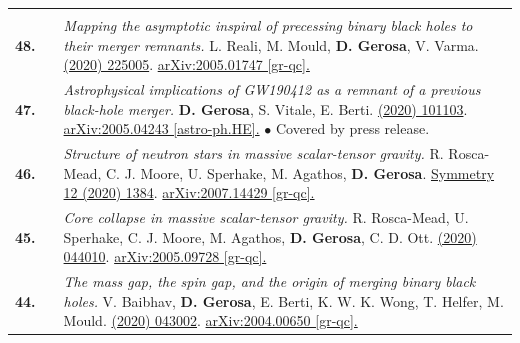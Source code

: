 {\begin{longtable}{rp{0.3cm}p{15.8cm}}
\vspace{0.09cm}\\
%
\textbf{48.} & & \textit{Mapping the asymptotic inspiral of precessing binary black holes to their merger remnants.}
\newline{}
L. Reali, M. Mould, \textbf{D. Gerosa}, V. Varma.
\newline{}
\href{https://iopscience.iop.org/article/10.1088/1361-6382/abb639/meta}{\cqg 37 (2020) 225005}. \href{https://arxiv.org/abs/2005.01747}{arXiv:2005.01747 [gr-qc].}
\vspace{0.09cm}\\
%
\textbf{47.} & & \textit{Astrophysical implications of GW190412 as a remnant of a previous black-hole merger.}
\newline{}
\textbf{D. Gerosa}, S. Vitale, E. Berti.
\newline{}
\href{https://journals.aps.org/prl/abstract/10.1103/PhysRevLett.125.101103}{\prl 125 (2020) 101103}. \href{https://arxiv.org/abs/2005.04243}{arXiv:2005.04243 [astro-ph.HE].}
\newline{}
\textcolor{color1}{$\bullet$} Covered by press release.
\vspace{0.09cm}\\
%
\textbf{46.} & & \textit{Structure of neutron stars in massive scalar-tensor gravity.}
\newline{}
R. Rosca-Mead, C. J. Moore, U. Sperhake, M. Agathos, \textbf{D. Gerosa}.
\newline{}
\href{https://www.mdpi.com/2073-8994/12/9/1384}{Symmetry 12 (2020) 1384}. \href{https://arxiv.org/abs/2007.14429}{arXiv:2007.14429 [gr-qc].}
\vspace{0.09cm}\\
%
\textbf{45.} & & \textit{Core collapse in massive scalar-tensor gravity.}
\newline{}
R. Rosca-Mead, U. Sperhake, C. J. Moore, M. Agathos, \textbf{D. Gerosa}, C. D. Ott.
\newline{}
\href{https://journals.aps.org/prd/abstract/10.1103/PhysRevD.102.044010}{\prd 102 (2020) 044010}. \href{https://arxiv.org/abs/2005.09728}{arXiv:2005.09728 [gr-qc].}
\vspace{0.09cm}\\
%
\textbf{44.} & & \textit{The mass gap, the spin gap, and the origin of merging binary black holes.}
\newline{}
V. Baibhav, \textbf{D. Gerosa}, E. Berti, K. W. K. Wong, T. Helfer, M. Mould.
\newline{}
\href{https://journals.aps.org/prd/abstract/10.1103/PhysRevD.102.043002}{\prd 102 (2020) 043002}. \href{https://arxiv.org/abs/2004.00650}{arXiv:2004.00650 [gr-qc].}

\end{longtable}}

